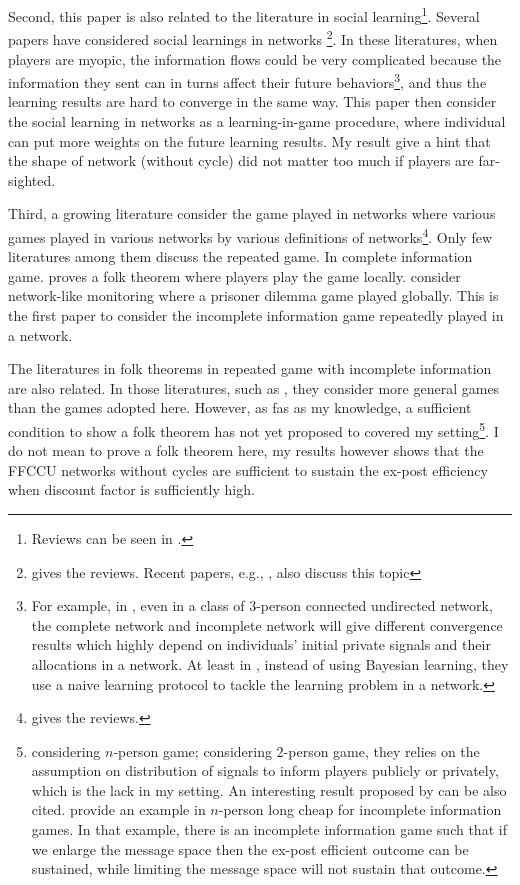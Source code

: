 \documentclass[12pt,letter]{article}
\theoremstyle{definition}
\theoremstyle{remark}
\theoremstyle{claim}
\begin{document}
Second, this paper is also related to the literature in social learning\footnote{Reviews can be seen in \citep{Bikhchandani1998} \citep{Cao2001}.}. Several papers have considered social learnings in networks \footnote{\citep{Goyal2012} gives the reviews. Recent papers, e.g., \citep{Acemoglu2011}\citep{Chatterjee2011}, also discuss this topic}. In these literatures, when players are myopic, the information flows could be very complicated because the information they sent can in turns affect their future behaviors\footnote{For example, in \citep{RePEc:eee:gamebe:v:45:y:2003:i:2:p:329-346},  even in a class of 3-person connected undirected network, the complete network and incomplete network will give different convergence results which highly depend on individuals' initial private signals and their allocations in a network. At least in \citep{Golub2010}, instead of using Bayesian learning, they use a naive learning protocol to tackle the learning problem in a network.}, and thus the learning results are hard to converge in the same way. This paper then consider the social learning in networks as a learning-in-game procedure, where individual can put more weights on the future learning results. My result give a hint that the shape of network (without cycle) did not matter too much if players are far-sighted.

Third, a growing literature consider the game played in networks where various games played in various networks by various definitions of networks\footnote{\citep{Jackson2008}\citep{Goyal2012} gives the reviews.}. Only few literatures among them discuss the repeated game. In complete information game. \citep{Laclau2012} proves a folk theorem where players play the game locally. \citep{Wolitzky2013} \citep{Wolitzky2014} consider network-like monitoring where a prisoner dilemma game played globally. This is the first paper to consider the incomplete information game repeatedly played in a network. 

The literatures in folk theorems in repeated game with incomplete information are also related. In those literatures, such as \citep{Fudenberg2010} \citep{Fudenberg2011} \citep{Wiseman2012}, they consider more general games than the games adopted here. However, as fas as my knowledge, a sufficient condition to show a folk theorem has not yet proposed to covered my setting\footnote{\citep{Fudenberg2010} \citep{Fudenberg2011} \citep{Wiseman2012} considering $n$-person game; \citep{Yamamoto2014} considering $2$-person game, they relies on the assumption on distribution of signals to inform players publicly or privately, which is the lack in my setting. An interesting result proposed by \citep{Amitai} can be also cited. \citep{Amitai} provide an example in $n$-person long cheap for incomplete information games. In that example, there is an incomplete information game such that if we enlarge the message space then the ex-post efficient outcome can be sustained, while limiting the message space will not sustain that outcome.}. I do not mean to prove a folk theorem here, my results however shows that the FFCCU networks without cycles are sufficient to sustain the ex-post efficiency when discount factor is sufficiently high. 
\end{document}
